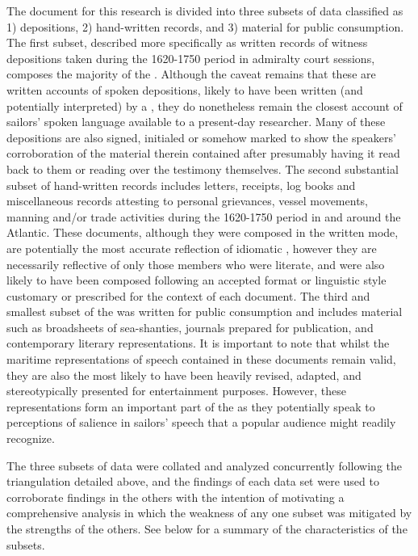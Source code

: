 The document  for this research is divided into three subsets of data classified as 1) depositions, 2) hand-written records, and 3) material for public consumption. The first subset, described more specifically as written records of witness depositions taken during the 1620-1750 period in admiralty court sessions, composes the majority of the . Although the caveat remains that these are written accounts of spoken depositions, likely to have been written (and potentially interpreted) by a , they do nonetheless remain the closest account of sailors’ spoken language available to a present-day researcher. Many of these depositions are also signed, initialed or somehow marked to show the speakers’ corroboration of the material therein contained after presumably having it read back to them or reading over the testimony themselves. The second substantial subset of hand-written records includes letters, receipts, log books and miscellaneous records attesting to personal grievances, vessel movements, manning and/or trade activities during the 1620-1750 period in and around the Atlantic. These documents, although they were composed in the written mode, are potentially the most accurate reflection of idiomatic , however they are necessarily reflective of only those  members who were literate, and were also likely to have been composed following an accepted format or linguistic style customary or prescribed for the context of each document. The third and smallest subset of the  was written for public consumption and includes material such as broadsheets of sea-shanties, journals prepared for publication, and contemporary literary representations. It is important to note that whilst the maritime representations of speech contained in these documents remain valid, they are also the most likely to have been heavily revised, adapted, and stereotypically presented for entertainment purposes. However, these representations form an important part of the  as they potentially speak to perceptions of salience in sailors’ speech that a popular audience might readily recognize. 



The three subsets of data were collated and analyzed concurrently following the triangulation  detailed above, and the findings of each data set were used to corroborate findings in the others with the intention of motivating a comprehensive analysis in which the weakness of any one subset was mitigated by the strengths of the others. See  below for a summary of the characteristics of the  subsets. 





